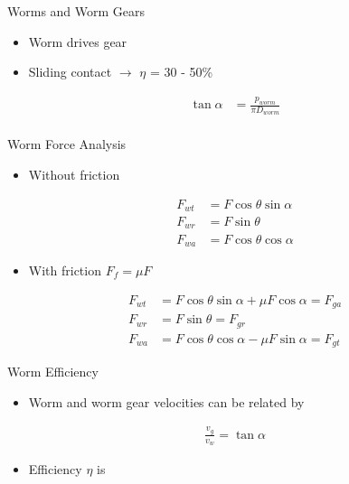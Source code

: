 \documentclass[a4paper,openany]{tufte-book}
\begin{document}
Worms and Worm Gears

\begin{itemize}
\item Worm drives gear

\item Sliding contact \(\rightarrow\) \(\eta\) = 30 - 50\%
\end{itemize}

\begin{align}
        \tan \alpha &= \frac{p_{worm}}{\pi D_{worm}} \\
      \end{align}

Worm Force Analysis

\begin{itemize}
\item Without friction
\end{itemize}

\begin{align}
        F_{wt} &= F \cos \theta \sin \alpha \\
        F_{wr} &= F \sin \theta \\
        F_{wa} &= F \cos \theta \cos \alpha
      \end{align}

\begin{itemize}
\item With friction \(F_{f} = \mu F\)
\end{itemize}

\begin{align}
        F_{wt} &= F \cos \theta \sin \alpha + \mu F \cos \alpha = F_{ga} \\
        F_{wr} &= F \sin \theta = F_{gr} \\
        F_{wa} &= F \cos \theta \cos \alpha - \mu F \sin \alpha = F_{gt}
      \end{align}

Worm Efficiency

\begin{itemize}
\item Worm and worm gear velocities can be related by
\end{itemize}

\begin{align}
    \frac{v_{g}}{v_{w}} = \tan \alpha
  \end{align}

\begin{itemize}
\item Efficiency \(\eta\) is
\end{itemize}
\end{document}
